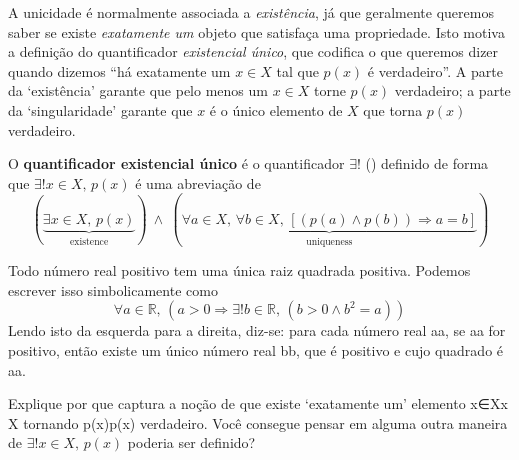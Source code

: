 A unicidade é normalmente associada a \textit{existência}, já que geralmente queremos saber se existe \textit{exatamente um} objeto que satisfaça uma propriedade. Isto motiva a definição do quantificador \textit{existencial único}, que codifica o que queremos dizer quando dizemos “há exatamente um $x \in X$ tal que $p(x)$ é verdadeiro”. A parte da `existência' garante que pelo menos um $x \in X$ torne $p(x)$ verdadeiro; a parte da `singularidade' garante que $x$ é o único elemento de $X$ que torna $p(x)$ verdadeiro.

\begin{definition}
\label{defUniqueExistentialQuantifier}
O \textbf{quantificador existencial único} é o quantificador $\exists !$ (\lindexmmc{\exists!}{$\exists!$}) definido de forma que $\exists ! x \in X,\, p(x)$ é uma abreviação de
\[(\underbrace{\exists x \in X,\, p(x)}_{\text{existence}}) ~ \wedge ~ (\underbrace{\forall a \in X,\, \forall b \in X,\, [(p(a) \wedge p(b)) \Rightarrow a=b]}_{\text{uniqueness}})\]
\end{definition}

\begin{example}
\label{exEveryPositiveRealHasUniqueSquareRoot}
Todo número real positivo tem uma única raiz quadrada positiva. Podemos escrever isso simbolicamente como
\[\forall a \in \mathbb{R},\, (a > 0 \Rightarrow \exists ! b \in \mathbb{R},\, (b > 0 \wedge b^2=a))\]
Lendo isto da esquerda para a direita, diz-se: para cada número real aa, se aa for positivo, então existe um único número real bb, que é positivo e cujo quadrado é aa.
\end{example}

\begin{discussion}
Explique por que  captura a noção de que existe `exatamente um' elemento x∈Xx \in X tornando p(x)p(x) verdadeiro. Você consegue pensar em alguma outra maneira de $\exists ! x \in X,\, p(x)$ poderia ser definido?
\end{discussion}


